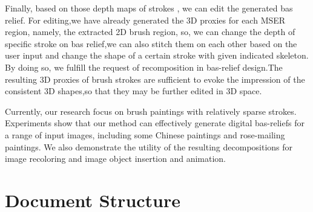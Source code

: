 Finally, based on those depth maps of strokes , we can edit the generated bas relief. For editing,we have already generated the 3D proxies for each MSER region, namely, the extracted 2D brush region, so, we can change the depth of specific stroke on bas relief,we can also stitch them on each other based on the user input and change the shape of a certain stroke with given indicated skeleton. By doing so, we fulfill the request of recomposition in bas-relief design.The resulting 3D proxies of brush strokes are sufficient to evoke the impression of the consistent 3D shapes,so that they may be further edited in 3D space. 

Currently, our research focus on brush paintings with relatively sparse strokes. Experiments show that our method can effectively generate digital bas-reliefs for a range of input images, including some Chinese paintings and rose-mailing paintings. We also demonstrate the utility of the resulting decompositions for image recoloring and image object insertion and animation.

\section{Document Structure}


\newpage